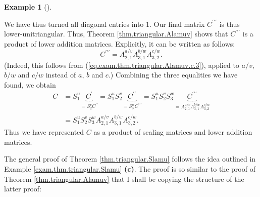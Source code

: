 \documentclass[numbers=enddot,12pt,final,onecolumn,notitlepage]{scrartcl}%
\theoremstyle{definition}
\newtheorem{exam}[theo]{Example}
\newenvironment{example}[1][]
{\begin{exam}[#1]\begin{leftbar}}
{\end{leftbar}\end{exam}}
\begin{document}
\begin{example}
We have thus turned all diagonal entries into $1$. Our final matrix
$C^{\prime\prime\prime}$ is thus lower-unitriangular. Thus, Theorem
\ref{thm.triangular.Alamuv} shows that $C^{\prime\prime\prime}$ is a product
of lower addition matrices. Explicitly, it can be written as follows:%
\[
C^{\prime\prime\prime}=A_{2,1}^{a/v}A_{3,1}^{b/w}A_{3,2}^{c/w}.
\]
(Indeed, this follows from (\ref{eq.exam.thm.triangular.Alamuv.c.3}), applied
to $a/v$, $b/w$ and $c/w$ instead of $a$, $b$ and $c$.) Combining the three
equalities we have found, we obtain%
\begin{align*}
C  &  =S_{1}^{u}\underbrace{C^{\prime}}_{=S_{2}^{v}C^{\prime\prime}}=S_{1}%
^{u}S_{2}^{v}\underbrace{C^{\prime\prime}}_{=S_{3}^{w}C^{\prime\prime\prime}%
}=S_{1}^{u}S_{2}^{v}S_{3}^{w}\underbrace{C^{\prime\prime\prime}}%
_{=A_{2,1}^{a/v}A_{3,1}^{b/w}A_{3,2}^{c/w}}\\
&  =S_{1}^{u}S_{2}^{v}S_{3}^{w}A_{2,1}^{a/v}A_{3,1}^{b/w}A_{3,2}^{c/w}.
\end{align*}
Thus we have represented $C$ as a product of scaling matrices and lower
addition matrices.
\end{example}

The general proof of Theorem \ref{thm.triangular.Slamu} follows the idea
outlined in Example \ref{exam.thm.triangular.Slamu} \textbf{(c)}. The proof is
so similar to the proof of Theorem \ref{thm.triangular.Alamuv} that I shall be
copying the structure of the latter proof:
\end{document}
